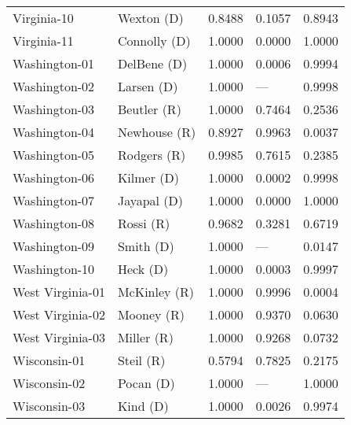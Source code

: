 \begin{longtable}{llrll}
       Virginia-10 &          {\color{Blue} Wexton (D)} &       0.8488 &        0.1057 &        0.8943 \\
       Virginia-11 &        {\color{Blue} Connolly (D)} &       1.0000 &        0.0000 &        1.0000 \\
     Washington-01 &         {\color{Blue} DelBene (D)} &       1.0000 &        0.0006 &        0.9994 \\
     Washington-02 &          {\color{Blue} Larsen (D)} &       1.0000 &           --- &        0.9998 \\
     Washington-03 &          {\color{Red} Beutler (R)} &       1.0000 &        0.7464 &        0.2536 \\
     Washington-04 &         {\color{Red} Newhouse (R)} &       0.8927 &        0.9963 &        0.0037 \\
     Washington-05 &          {\color{Red} Rodgers (R)} &       0.9985 &        0.7615 &        0.2385 \\
     Washington-06 &          {\color{Blue} Kilmer (D)} &       1.0000 &        0.0002 &        0.9998 \\
     Washington-07 &         {\color{Blue} Jayapal (D)} &       1.0000 &        0.0000 &        1.0000 \\
     Washington-08 &            {\color{Red} Rossi (R)} &       0.9682 &        0.3281 &        0.6719 \\
     Washington-09 &           {\color{Blue} Smith (D)} &       1.0000 &           --- &        0.0147 \\
     Washington-10 &            {\color{Blue} Heck (D)} &       1.0000 &        0.0003 &        0.9997 \\
  West Virginia-01 &         {\color{Red} McKinley (R)} &       1.0000 &        0.9996 &        0.0004 \\
  West Virginia-02 &           {\color{Red} Mooney (R)} &       1.0000 &        0.9370 &        0.0630 \\
  West Virginia-03 &           {\color{Red} Miller (R)} &       1.0000 &        0.9268 &        0.0732 \\
      Wisconsin-01 &            {\color{Red} Steil (R)} &       0.5794 &        0.7825 &        0.2175 \\
      Wisconsin-02 &           {\color{Blue} Pocan (D)} &       1.0000 &           --- &        1.0000 \\
      Wisconsin-03 &            {\color{Blue} Kind (D)} &       1.0000 &        0.0026 &        0.9974 \\

\end{longtable}
